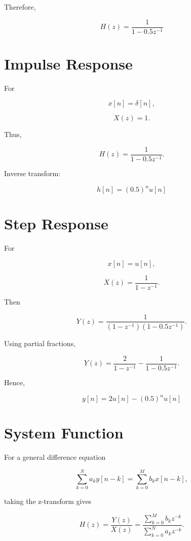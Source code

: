 Therefore,

\[
\boxed{
H(z)=
\frac{1}{1-0.5z^{-1}}
}
\]


\section{Impulse Response}

For

\[
x[n]=\delta[n],
\]

\[
X(z)=1.
\]

Thus,

\[
H(z)=
\frac{1}{1-0.5z^{-1}}.
\]

Inverse transform:

\[
\boxed{
h[n]=(0.5)^n u[n]
}
\]


\section{Step Response}

For

\[
x[n]=u[n],
\]

\[
X(z)=
\frac{1}{1-z^{-1}}.
\]

Then

\[
Y(z)=
\frac{1}{(1-z^{-1})(1-0.5z^{-1})}.
\]

Using partial fractions,

\[
Y(z)=
\frac{2}{1-z^{-1}}
-
\frac{1}{1-0.5z^{-1}}.
\]

Hence,

\[
\boxed{
y[n]=
2u[n]-(0.5)^n u[n]
}
\]


\section{System Function}

For a general difference equation

\[
\sum_{k=0}^{N}a_k y[n-k]
=
\sum_{k=0}^{M}b_k x[n-k],
\]

taking the z-transform gives

\[
H(z)=
\frac{Y(z)}{X(z)}
=
\frac{\sum_{k=0}^{M}b_k z^{-k}}
{\sum_{k=0}^{N}a_k z^{-k}}.
\]


